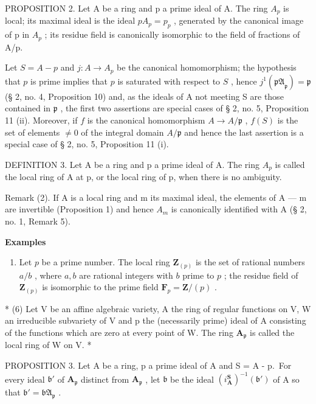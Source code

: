 PROPOSITION 2. Let A be a ring and p a prime ideal of A. The ring \(A_{p}\) is local; its maximal ideal is the ideal \(pA_{p} = p_{p}\) , generated by the canonical image of p in \(A_{p}\) ; its residue field is canonically isomorphic to the field of fractions of A/p.

Let \(S = A - p\) and \(j: A \to A_p\) be the canonical homomorphism; the hypothesis that \(p\) is prime implies that \(p\) is saturated with respect to \(S\) , hence \(j^{1}(\mathfrak{pA}_{\mathfrak{p}}) = \mathfrak{p}\) (§ 2, no. 4, Proposition 10) and, as the ideals of A not meeting S are those contained in \(\mathfrak{p}\) , the first two assertions are special cases of § 2, no. 5, Proposition 11 (ii). Moreover, if \(f\) is the canonical homomorphism \(A \to A/\mathfrak{p}\) , \(f(S)\) is the set of elements \(\neq 0\) of the integral domain \(A/\mathfrak{p}\) and hence the last assertion is a special case of § 2, no. 5, Proposition 11 (i).

DEFINITION 3. Let A be a ring and p a prime ideal of A. The ring \(A_{p}\) is called the local ring of A at p, or the local ring of p, when there is no ambiguity.

Remark (2). If A is a local ring and m its maximal ideal, the elements of A --- m are invertible (Proposition 1) and hence \(A_{m}\) is canonically identified with A (§ 2, no. 1, Remark 5).

\textbf{Examples}\par

\begin{enumerate}
\def\labelenumi{(\arabic{enumi})}
\setcounter{enumi}{4}
\tightlist
\item
  Let \(p\) be a prime number. The local ring \(\mathbf{Z}_{(p)}\) is the set of rational numbers \(a / b\) , where \(a, b\) are rational integers with \(b\) prime to \(p\) ; the residue field of \(\mathbf{Z}_{(p)}\) is isomorphic to the prime field \(\mathbf{F}_p = \mathbf{Z} / (p)\) .
\end{enumerate}

* (6) Let V be an affine algebraic variety, A the ring of regular functions on V, W an irreducible subvariety of V and p the (necessarily prime) ideal of A consisting of the functions which are zero at every point of W. The ring \(\mathbf{A}_{\mathfrak{p}}\) is called the local ring of W on V. *

PROPOSITION 3. Let A be a ring, p a prime ideal of A and S = A - p.~For every ideal \(\mathfrak{b}'\) of \(\mathbf{A}_{\mathfrak{p}}\) distinct from \(\mathbf{A}_{\mathfrak{p}}\) , let \(\mathfrak{b}\) be the ideal \((i_{\mathbf{A}}^{\mathbf{S}})^{-1}(\mathfrak{b}')\) of A so that \(\mathfrak{b}' = \mathfrak{bA}_{\mathfrak{p}}\) .


